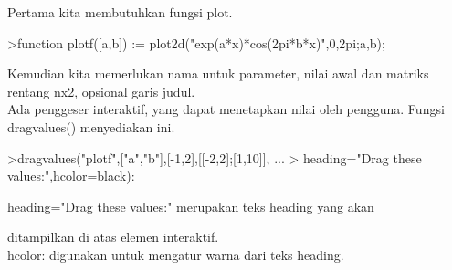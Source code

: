\documentclass{article}
\begin{document}
\begin{eulernotebook}
\begin{eulercomment}
\begin{eulercomment}
\begin{eulercomment}
\begin{eulercomment}
\begin{eulercomment}
\begin{eulercomment}
\begin{eulercomment}
\begin{eulercomment}
\begin{eulercomment}
\begin{eulercomment}
\begin{eulercomment}
Pertama kita membutuhkan fungsi plot.
\end{eulercomment}
\begin{eulerprompt}
>function plotf([a,b]) := plot2d("exp(a*x)*cos(2pi*b*x)",0,2pi;a,b);
\end{eulerprompt}
\begin{eulercomment}
Kemudian kita memerlukan nama untuk parameter, nilai awal dan matriks
rentang nx2, opsional garis judul.\\
Ada penggeser interaktif, yang dapat menetapkan nilai oleh pengguna.
Fungsi dragvalues() menyediakan ini.
\end{eulercomment}
\begin{eulerprompt}
>dragvalues("plotf",["a","b"],[-1,2],[[-2,2];[1,10]], ...
>  heading="Drag these values:",hcolor=black):
\end{eulerprompt}
\begin{eulerttcomment}
 heading="Drag these values:" merupakan teks heading yang akan
\end{eulerttcomment}
\begin{eulercomment}
ditampilkan di atas elemen interaktif.\\
hcolor: digunakan untuk mengatur warna dari teks heading. 


\end{eulercomment}
\end{eulercomment}
\end{eulercomment}
\end{eulercomment}
\end{eulercomment}
\end{eulercomment}
\end{eulercomment}
\end{eulercomment}
\end{eulercomment}
\end{eulercomment}
\end{eulercomment}
\end{eulernotebook}
\end{document}
